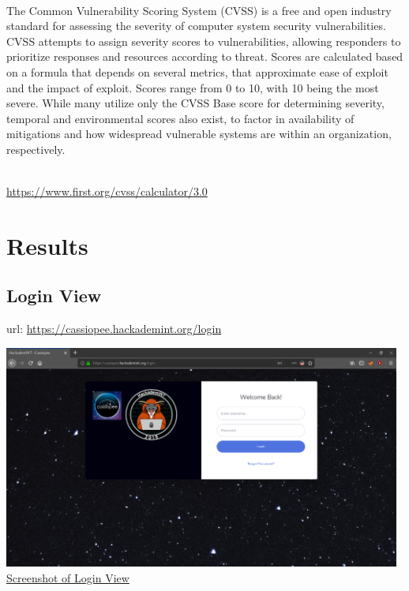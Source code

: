 \vspace{1cm}

\\
The Common Vulnerability Scoring System (CVSS) is a free and open industry standard for assessing the severity of computer system security vulnerabilities. CVSS attempts to assign severity scores to vulnerabilities, allowing responders to prioritize responses and resources according to threat. Scores are calculated based on a formula that depends on several metrics, that approximate ease of exploit and the impact of exploit. Scores range from 0 to 10, with 10 being the most severe. While many utilize only the CVSS Base score for determining severity, temporal and environmental scores also exist, to factor in availability of mitigations and how widespread vulnerable systems are within an organization, respectively.

\\
\vspace{0.2cm}
\url{https://www.first.org/cvss/calculator/3.0}

\pagebreak

\section{Results}

\subsection{Login View}
url: \url{https://cassiopee.hackademint.org/login}
\\
\begin{center}
\includegraphics[width=0.98\textwidth]{images/flask-application-01.png}
\\
\underline{Screenshot of Login View}
\end{center}


